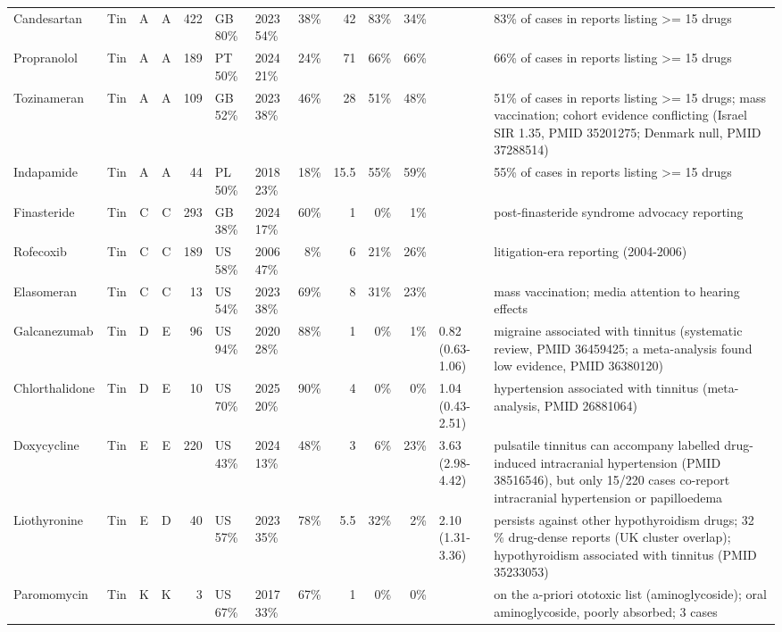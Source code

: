 \documentclass[10pt]{article}
\begin{document}
{\begin{longtable}{p{2.2cm}lccrllrrrrp{2.2cm}p{4.6cm}}
Candesartan & Tin & A & A & 422 & GB 80\% & 2023 54\% & 38\% & 42 & 83\% & 34\% &  & 83\% of cases in reports listing >= 15 drugs \\
Propranolol & Tin & A & A & 189 & PT 50\% & 2024 21\% & 24\% & 71 & 66\% & 66\% &  & 66\% of cases in reports listing >= 15 drugs \\
Tozinameran & Tin & A & A & 109 & GB 52\% & 2023 38\% & 46\% & 28 & 51\% & 48\% &  & 51\% of cases in reports listing >= 15 drugs; mass vaccination; cohort evidence conflicting (Israel SIR 1.35, PMID 35201275; Denmark null, PMID 37288514) \\
Indapamide & Tin & A & A & 44 & PL 50\% & 2018 23\% & 18\% & 15.5 & 55\% & 59\% &  & 55\% of cases in reports listing >= 15 drugs \\
Finasteride & Tin & C & C & 293 & GB 38\% & 2024 17\% & 60\% & 1 & 0\% & 1\% &  & post-finasteride syndrome advocacy reporting \\
Rofecoxib & Tin & C & C & 189 & US 58\% & 2006 47\% & 8\% & 6 & 21\% & 26\% &  & litigation-era reporting (2004-2006) \\
Elasomeran & Tin & C & C & 13 & US 54\% & 2023 38\% & 69\% & 8 & 31\% & 23\% &  & mass vaccination; media attention to hearing effects \\
Galcanezumab & Tin & D & E & 96 & US 94\% & 2020 28\% & 88\% & 1 & 0\% & 1\% & 0.82 (0.63-1.06) & migraine associated with tinnitus (systematic review, PMID 36459425; a meta-analysis found low evidence, PMID 36380120) \\
Chlorthalidone & Tin & D & E & 10 & US 70\% & 2025 20\% & 90\% & 4 & 0\% & 0\% & 1.04 (0.43-2.51) & hypertension associated with tinnitus (meta-analysis, PMID 26881064) \\
Doxycycline & Tin & E & E & 220 & US 43\% & 2024 13\% & 48\% & 3 & 6\% & 23\% & 3.63 (2.98-4.42) & pulsatile tinnitus can accompany labelled drug-induced intracranial hypertension (PMID 38516546), but only 15/220 cases co-report intracranial hypertension or papilloedema \\
Liothyronine & Tin & E & D & 40 & US 57\% & 2023 35\% & 78\% & 5.5 & 32\% & 2\% & 2.10 (1.31-3.36) & persists against other hypothyroidism drugs; 32 \% drug-dense reports (UK cluster overlap); hypothyroidism associated with tinnitus (PMID 35233053) \\
Paromomycin & Tin & K & K & 3 & US 67\% & 2017 33\% & 67\% & 1 & 0\% & 0\% &  & on the a-priori ototoxic list (aminoglycoside); oral aminoglycoside, poorly absorbed; 3 cases \\
\bottomrule
\end{longtable}}
\end{document}
